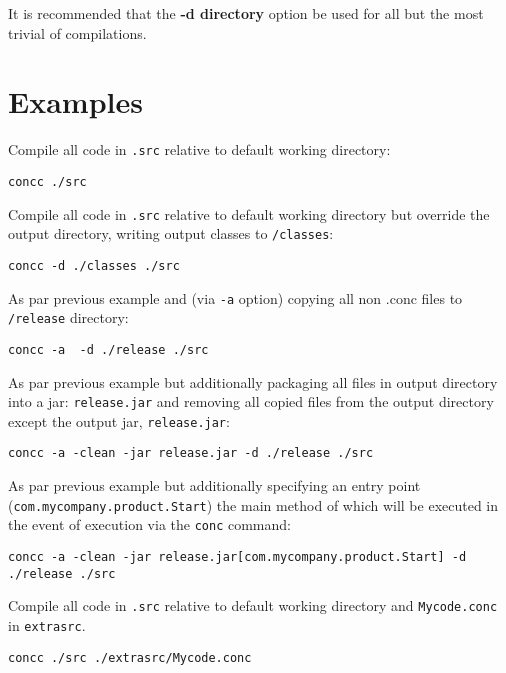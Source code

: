\documentclass[conc-doc]{subfiles}
\begin{document}
It is recommended that the \textbf{-d directory} option be used for all but the most trivial of compilations.

\section{Examples}
Compile all code in \lstinline[language=None]{.src} relative to default working directory:
\begin{lstlisting}
concc ./src 
\end{lstlisting}

Compile all code in \lstinline[language=None]{.src} relative to default working directory but override the output directory, writing output classes to \lstinline[language=None]{/classes}:
\begin{lstlisting}
concc -d ./classes ./src 
\end{lstlisting}

As par previous example and (via \lstinline[language=None]{-a} option) copying all non .conc files to \lstinline[language=None]{/release} directory:
\begin{lstlisting}
concc -a  -d ./release ./src 
\end{lstlisting}

As par previous example but additionally packaging all files in output directory into a jar: \lstinline[language=None]{release.jar} and removing all copied files from the output directory except the output jar, \lstinline[language=None]{release.jar}:
\begin{lstlisting}
concc -a -clean -jar release.jar -d ./release ./src 
\end{lstlisting}

As par previous example but additionally specifying an entry point (\lstinline[language=None]{com.mycompany.product.Start}) the main method of which will be executed in the event of execution via the \lstinline[language=None]{conc} command:
\begin{lstlisting}
concc -a -clean -jar release.jar[com.mycompany.product.Start] -d ./release ./src 
\end{lstlisting}

Compile all code in \lstinline[language=None]{.src} relative to default working directory and \lstinline[language=None]{Mycode.conc} in \lstinline[language=None]{extrasrc}.
\begin{lstlisting}
concc ./src ./extrasrc/Mycode.conc
\end{lstlisting}
\end{document}
